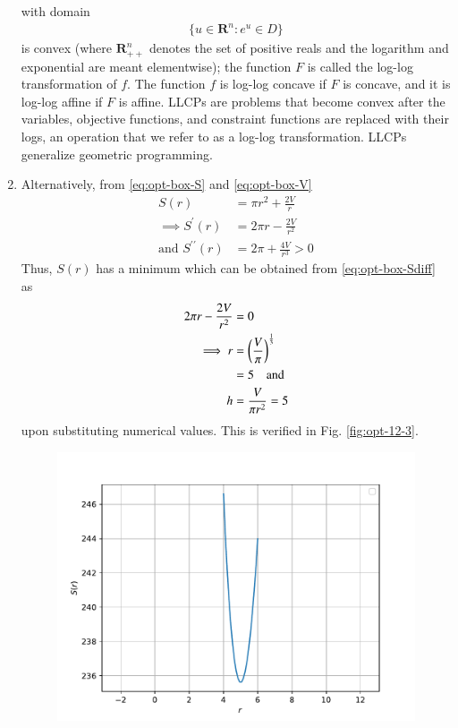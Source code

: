 \begin{enumerate}[label=\thesection.\arabic*.,ref=\thesection.\theenumi]
				with domain
				\begin{align}
				\{u \in \mathbf{R}^n : e^u \in D\}
				\end{align}
				is convex (where
$				\mathbf{R}^{n}_{++}$
				denotes the set of positive reals and the logarithm and exponential are meant elementwise); the function $F$  is called the log-log transformation of $f$. The function $f$ is log-log concave if $F$ is concave, and it is log-log affine if $F$ is affine.
				LLCPs are problems that become convex after the variables, objective functions, and constraint functions are replaced with their logs, an operation that we refer to as a log-log transformation. LLCPs generalize geometric programming.
	\item 
		Alternatively, from 
			\eqref{eq:opt-box-S} and 
			\eqref{eq:opt-box-V}
		\begin{align}
			S(r) &= \pi r^2 +  \frac{2 V}{r} 
			\\
			\label{eq:opt-box-Sdiff}
			\implies 
			S^{\prime}(r) &= 2\pi r -  \frac{2 V}{r^2} 
			\\
			\text{and }
			S^{\prime\prime}(r) &= 2\pi  +  \frac{4 V}{r^3} > 0 
		\end{align}
		Thus, $S(r)$ has a minimum which can be obtained from 
			\eqref{eq:opt-box-Sdiff} as
		\begin{align}
			2\pi r -  \frac{2 V}{r^2} &= 0
			\\
			\implies r &= \left(\frac{V}{\pi}\right)^{\frac{1}{3}}
			\\
			&= 5 \quad \text{and }
			\\
			h &= \frac{V}{\pi r^2} = 5
		\end{align}
		upon substituting numerical values.
		This is verified in 
Fig. 
	\ref{fig:opt-12-3}.
\begin{figure}[!h]
	\centering
	\includegraphics[width=\columnwidth]{figs/opt/opt-12-3.pdf}

\end{figure}
\end{enumerate}

